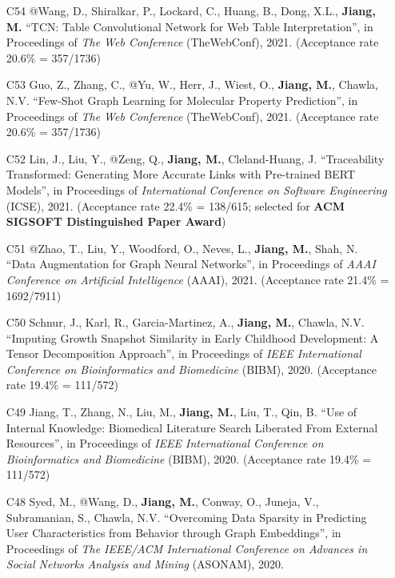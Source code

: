 \documentclass[10pt]{article}
\newenvironment{myindentpar}[1]%
{\begin{list}{}%
         {\setlength{\leftmargin}{#1}}%
         \item[]%
}
{\end{list}}
\newcounter{list}
\begin{document}
\begin{myindentpar}{0.00cm}
\begin{enumerate}[leftmargin=.5cm]
\item[C54] @Wang, D., Shiralkar, P., Lockard, C., Huang, B., Dong, X.L., \textbf{Jiang, M.} ``TCN: Table Convolutional Network for Web Table Interpretation'', in Proceedings of \textit{The Web Conference} (TheWebConf), 2021. (Acceptance rate 20.6\% = 357/1736)

\item[C53] Guo, Z., Zhang, C., @Yu, W., Herr, J., Wiest, O., \textbf{Jiang, M.}, Chawla, N.V. ``Few-Shot Graph Learning for Molecular Property Prediction'', in Proceedings of \textit{The Web Conference} (TheWebConf), 2021. (Acceptance rate 20.6\% = 357/1736)

\item[C52] Lin, J., Liu, Y., @Zeng, Q., \textbf{Jiang, M.}, Cleland-Huang, J. ``Traceability Transformed: Generating More Accurate Links with Pre-trained BERT Models'', in Proceedings of \textit{International Conference on Software Engineering} (ICSE), 2021. (Acceptance rate 22.4\% = 138/615; selected for \textbf{ACM SIGSOFT Distinguished Paper Award})

\item[C51] @Zhao, T., Liu, Y., Woodford, O., Neves, L., \textbf{Jiang, M.}, Shah, N. ``Data Augmentation for Graph Neural Networks'', in Proceedings of \textit{AAAI Conference on Artificial Intelligence} (AAAI), 2021. (Acceptance rate 21.4\% = 1692/7911)

\item[C50] Schnur, J., Karl, R., Garcia-Martinez, A., \textbf{Jiang, M.}, Chawla, N.V. ``Imputing Growth Snapshot Similarity in Early Childhood Development: A Tensor Decomposition Approach'', in Proceedings of \textit{IEEE International Conference on Bioinformatics and Biomedicine} (BIBM), 2020. (Acceptance rate 19.4\% = 111/572)

\item[C49] Jiang, T., Zhang, N., Liu, M., \textbf{Jiang, M.}, Liu, T., Qin, B. ``Use of Internal Knowledge: Biomedical Literature Search Liberated From External Resources'', in Proceedings of \textit{IEEE International Conference on Bioinformatics and Biomedicine} (BIBM), 2020. (Acceptance rate 19.4\% = 111/572)

\item[C48] Syed, M., @Wang, D., \textbf{Jiang, M.}, Conway, O., Juneja, V., Subramanian, S., Chawla, N.V. ``Overcoming Data Sparsity in Predicting User Characteristics from Behavior through Graph Embeddings'', in Proceedings of \textit{The IEEE/ACM International Conference on Advances in Social Networks Analysis and Mining} (ASONAM), 2020.


\end{enumerate}
\end{myindentpar}
\end{document}
